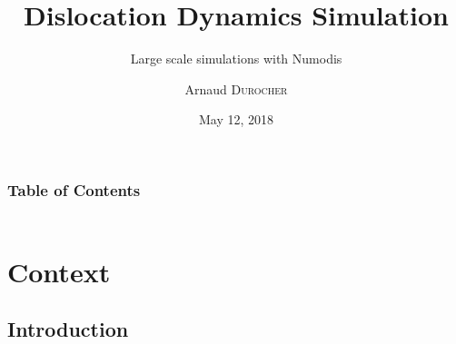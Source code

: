 \documentclass[aspectratio=1610,t,10pt]{beamer}
\title{Dislocation Dynamics Simulation}
\subtitle{Large scale simulations with Numodis}
\date{May 12, 2018}
\author[Arnaud Durocher]{Arnaud \textsc{Durocher}}
\institute[MdlS]{}
\begin{document}
\captionsetup{size=footnotesize,justification=centering,skip=1pt}

\begin{frame}[plain]
    \titlepage
\end{frame}

\begin{frame}
	\frametitle{Table of Contents}
	\framesubtitle{}
	\begin{columns}[t]
		\begin{column}{\textwidth}
			\tableofcontents
		\end{column}
	\end{columns}
\end{frame}

\section{Context}

\subsection{Introduction}
\end{document}
